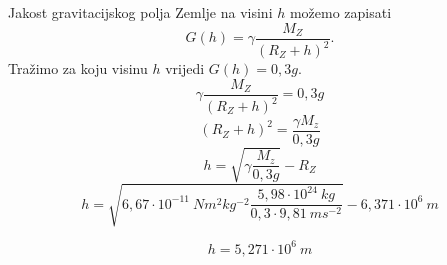 

Jakost gravitacijskog polja Zemlje na visini $h$ možemo zapisati
$$ G(h)= \gamma\frac{M_Z}{(R_Z+h)^2} . $$
Tražimo za koju visinu $h$ vrijedi $G(h)=0,3g.$
$$ \gamma\frac{M_Z}{(R_Z+h)^2} = 0,3g$$
$$ (R_Z+h)^2 = \frac{\gamma M_z}{0,3g} $$
$$ h = \sqrt{\gamma  \frac{M_z}{0,3g}}  - R_Z $$
$$ h = \sqrt{ 6,67\cdot  10^{−11}\ Nm^2kg^{−2}  \frac{ 5,98 \cdot  10^{24}\ kg }{0,3\cdot 9,81\ ms^{−2}} }  
- 6,371\cdot  10^6\ m$$

$$ h= 5,271\cdot 10^6\ m $$
